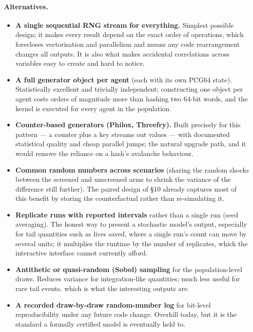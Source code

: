 \documentclass[12pt,a4paper]{article}
\newcommand{\alt}[1]{\paragraph{Alternatives.} #1}
\begin{document}
\alt{\begin{itemize}[nosep]
  \item \textbf{A single sequential RNG stream for everything.} Simplest possible design; it makes every
        result depend on the exact order of operations, which forecloses vectorisation and parallelism and
        means any code rearrangement changes all outputs. It is also what makes accidental correlations
        across variables easy to create and hard to notice.
  \item \textbf{A full generator object per agent} (each with its own PCG64 state). Statistically excellent
        and trivially independent; constructing one object per agent costs orders of magnitude more than
        hashing two 64-bit words, and the kernel is executed for every agent in the population.
  \item \textbf{Counter-based generators (Philox, Threefry).} Built precisely for this pattern --- a counter
        plus a key streams out values --- with documented statistical quality and cheap parallel jumps; the
        natural upgrade path, and it would remove the reliance on a hash's avalanche behaviour.
  \item \textbf{Common random numbers across scenarios} (sharing the random shocks between the screened and
        unscreened arms to shrink the variance of the difference still further). The paired design of \S10
        already captures most of this benefit by storing the counterfactual rather than re-simulating it.
  \item \textbf{Replicate runs with reported intervals} rather than a single run (seed averaging). The honest
        way to present a stochastic model's output, especially for tail quantities such as lives saved, where
        a single run's count can move by several units; it multiplies the runtime by the number of
        replicates, which the interactive interface cannot currently afford.
  \item \textbf{Antithetic or quasi-random (Sobol) sampling} for the population-level draws. Reduces
        variance for integration-like quantities; much less useful for rare tail events, which is what the
        interesting outputs are.
  \item \textbf{A recorded draw-by-draw random-number log} for bit-level reproducibility under any future
        code change. Overkill today, but it is the standard a formally certified model is eventually held
        to.
\end{itemize}}
\end{document}
